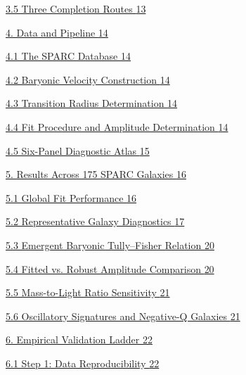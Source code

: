 \documentclass[11pt]{article}
\begin{document}
\hyperref[three-completion-routes]{3.5 Three Completion Routes \hyperref[three-completion-routes]{13}}

\hyperref[data-and-pipeline]{4. Data and Pipeline \hyperref[data-and-pipeline]{14}}

\hyperref[the-sparc-database]{4.1 The SPARC Database \hyperref[the-sparc-database]{14}}

\hyperref[baryonic-velocity-construction]{4.2 Baryonic Velocity Construction \hyperref[baryonic-velocity-construction]{14}}

\hyperref[transition-radius-determination]{4.3 Transition Radius Determination \hyperref[transition-radius-determination]{14}}

\hyperref[fit-procedure-and-amplitude-determination]{4.4 Fit Procedure and Amplitude Determination \hyperref[fit-procedure-and-amplitude-determination]{14}}

\hyperref[six-panel-diagnostic-atlas]{4.5 Six-Panel Diagnostic Atlas \hyperref[six-panel-diagnostic-atlas]{15}}

\hyperref[results-across-175-sparc-galaxies]{5. Results Across 175 SPARC Galaxies \hyperref[results-across-175-sparc-galaxies]{16}}

\hyperref[global-fit-performance]{5.1 Global Fit Performance \hyperref[global-fit-performance]{16}}

\hyperref[representative-galaxy-diagnostics]{5.2 Representative Galaxy Diagnostics \hyperref[representative-galaxy-diagnostics]{17}}

\hyperref[emergent-baryonic-tullyfisher-relation]{5.3 Emergent Baryonic Tully--Fisher Relation \hyperref[emergent-baryonic-tullyfisher-relation]{20}}

\hyperref[fitted-vs.-robust-amplitude-comparison]{5.4 Fitted vs. Robust Amplitude Comparison \hyperref[fitted-vs.-robust-amplitude-comparison]{20}}

\hyperref[mass-to-light-ratio-sensitivity]{5.5 Mass-to-Light Ratio Sensitivity \hyperref[mass-to-light-ratio-sensitivity]{21}}

\hyperref[oscillatory-signatures-and-negative-q-galaxies]{5.6 Oscillatory Signatures and Negative-Q Galaxies \hyperref[oscillatory-signatures-and-negative-q-galaxies]{21}}

\hyperref[empirical-validation-ladder]{6. Empirical Validation Ladder \hyperref[empirical-validation-ladder]{22}}

\hyperref[step-1-data-reproducibility]{6.1 Step 1: Data Reproducibility \hyperref[step-1-data-reproducibility]{22}}
\end{document}
